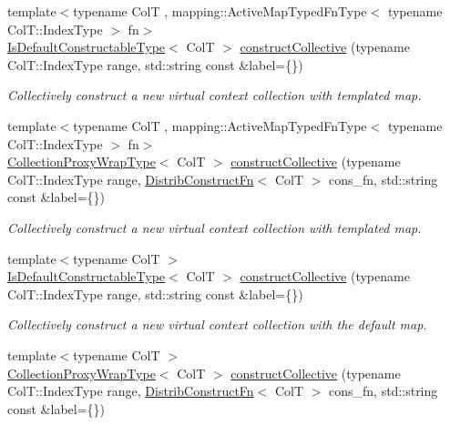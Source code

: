\begin{DoxyCompactItemize}
{\footnotesize template$<$typename ColT , mapping\+::\+Active\+Map\+Typed\+Fn\+Type$<$ typename Col\+T\+::\+Index\+Type $>$ fn$>$ }\\\hyperlink{structvt_1_1vrt_1_1collection_1_1_collection_manager_af8091fcb8218dad155ea028c9b5d283f}{Is\+Default\+Constructable\+Type}$<$ ColT $>$ \hyperlink{structvt_1_1vrt_1_1collection_1_1_collection_manager_a9df5c1771c8112c60e45d57d5c530ba8}{construct\+Collective} (typename Col\+T\+::\+Index\+Type range, std\+::string const \&label=\{\})
\begin{DoxyCompactList}\small\item\em Collectively construct a new virtual context collection with templated map. \end{DoxyCompactList}\item 
{\footnotesize template$<$typename ColT , mapping\+::\+Active\+Map\+Typed\+Fn\+Type$<$ typename Col\+T\+::\+Index\+Type $>$ fn$>$ }\\\hyperlink{structvt_1_1vrt_1_1collection_1_1_collection_manager_a56458ed7f9bb22b631b9b3a745f42f94}{Collection\+Proxy\+Wrap\+Type}$<$ ColT $>$ \hyperlink{structvt_1_1vrt_1_1collection_1_1_collection_manager_a29a9ac1bd384ac328bb149212676b751}{construct\+Collective} (typename Col\+T\+::\+Index\+Type range, \hyperlink{structvt_1_1vrt_1_1collection_1_1_collection_manager_a9ef5ab71e344fdee8525c3f18241c305}{Distrib\+Construct\+Fn}$<$ ColT $>$ cons\+\_\+fn, std\+::string const \&label=\{\})
\begin{DoxyCompactList}\small\item\em Collectively construct a new virtual context collection with templated map. \end{DoxyCompactList}\item 
{\footnotesize template$<$typename ColT $>$ }\\\hyperlink{structvt_1_1vrt_1_1collection_1_1_collection_manager_af8091fcb8218dad155ea028c9b5d283f}{Is\+Default\+Constructable\+Type}$<$ ColT $>$ \hyperlink{structvt_1_1vrt_1_1collection_1_1_collection_manager_a2dcf5a95489eee7ec79fc1ffdd528db2}{construct\+Collective} (typename Col\+T\+::\+Index\+Type range, std\+::string const \&label=\{\})
\begin{DoxyCompactList}\small\item\em Collectively construct a new virtual context collection with the default map. \end{DoxyCompactList}\item 
{\footnotesize template$<$typename ColT $>$ }\\\hyperlink{structvt_1_1vrt_1_1collection_1_1_collection_manager_a56458ed7f9bb22b631b9b3a745f42f94}{Collection\+Proxy\+Wrap\+Type}$<$ ColT $>$ \hyperlink{structvt_1_1vrt_1_1collection_1_1_collection_manager_a9888879eab5c8d6d151f91aa4de0aadb}{construct\+Collective} (typename Col\+T\+::\+Index\+Type range, \hyperlink{structvt_1_1vrt_1_1collection_1_1_collection_manager_a9ef5ab71e344fdee8525c3f18241c305}{Distrib\+Construct\+Fn}$<$ ColT $>$ cons\+\_\+fn, std\+::string const \&label=\{\})

\end{DoxyCompactItemize}
